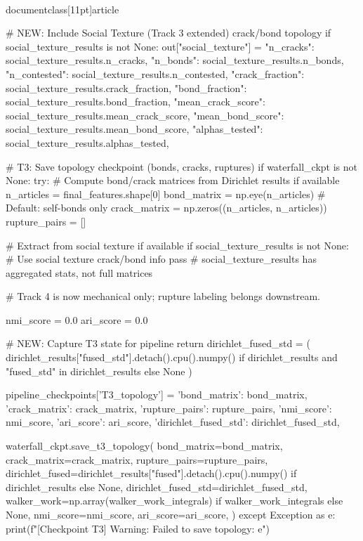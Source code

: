 \\documentclass[11pt]{article}
\begin{document}
\begin{CodeBlock}
        # NEW: Include Social Texture (Track 3 extended) crack/bond topology
        if social_texture_results is not None:
            out["social_texture"] = {
                "n_cracks": social_texture_results.n_cracks,
                "n_bonds": social_texture_results.n_bonds,
                "n_contested": social_texture_results.n_contested,
                "crack_fraction": social_texture_results.crack_fraction,
                "bond_fraction": social_texture_results.bond_fraction,
                "mean_crack_score": social_texture_results.mean_crack_score,
                "mean_bond_score": social_texture_results.mean_bond_score,
                "alphas_tested": social_texture_results.alphas_tested,
            }

        # T3: Save topology checkpoint (bonds, cracks, ruptures)
        if waterfall_ckpt is not None:
            try:
                # Compute bond/crack matrices from Dirichlet results if available
                n_articles = final_features.shape[0]
                bond_matrix = np.eye(n_articles)  # Default: self-bonds only
                crack_matrix = np.zeros((n_articles, n_articles))
                rupture_pairs = []

                # Extract from social texture if available
                if social_texture_results is not None:
                    # Use social texture crack/bond info
                    pass  # social_texture_results has aggregated stats, not full matrices

                # Track 4 is now mechanical only; rupture labeling belongs downstream.

                nmi_score = 0.0
                ari_score = 0.0

                # NEW: Capture T3 state for pipeline return
                dirichlet_fused_std = (
                    dirichlet_results["fused_std"].detach().cpu().numpy()
                    if dirichlet_results and "fused_std" in dirichlet_results
                    else None
                )

                pipeline_checkpoints['T3_topology'] = {
                    'bond_matrix': bond_matrix,
                    'crack_matrix': crack_matrix,
                    'rupture_pairs': rupture_pairs,
                    'nmi_score': nmi_score,
                    'ari_score': ari_score,
                    'dirichlet_fused_std': dirichlet_fused_std,
                }

                waterfall_ckpt.save_t3_topology(
                    bond_matrix=bond_matrix,
                    crack_matrix=crack_matrix,
                    rupture_pairs=rupture_pairs,
                    dirichlet_fused=dirichlet_results["fused"].detach().cpu().numpy() if dirichlet_results else None,
                    dirichlet_fused_std=dirichlet_fused_std,
                    walker_work=np.array(walker_work_integrals) if walker_work_integrals else None,
                    nmi_score=nmi_score,
                    ari_score=ari_score,
                )
            except Exception as e:
                print(f"[Checkpoint T3] Warning: Failed to save topology: {e}")


\end{CodeBlock}
\end{document}
